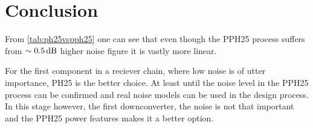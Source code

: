 	\section{Conclusion}
		From \autoref{tab:ph25vspph25} one can see that even though the PPH25 process suffers from $\sim \unit[0.5]{dB}$ higher noise figure it is vastly more linear.
		

		For the first component in a reciever chain, where low noise is of utter importance, PH25 is the better choice. At least until the noise level in the PPH25 process can be confirmed and real noise models can be used in the design process. In this stage however, the first downconverter, the noise is not that important and the PPH25 power features makes it a better option.